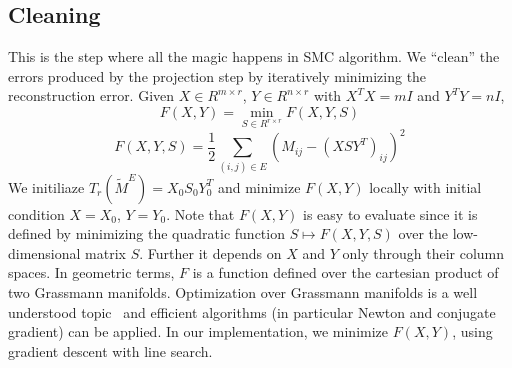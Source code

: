 \subsection{Cleaning}
This is the step where all the magic happens in SMC algorithm. We
``clean'' the errors produced by the projection step by iteratively
minimizing the reconstruction error. Given $X \in R^{m\times r}$,
$Y \in R^{n\times r}$ with $X^TX = mI$ and $Y^TY = nI$,
\begin{equation}
  F(X,Y) = \min_{S \in R^{r \times r}} F(X,Y,S)
\end{equation}
\begin{equation}
  F(X,Y,S) = \frac{1}{2} \sum\limits_{(i,j) \in E} (M_{ij} - (XSY^T)_{ij})^2
\end{equation}
We initiliaze $T_r(\widetilde{M}^E) = X_0S_0Y_0^T$ and minimize
$F(X, Y)$ locally with initial condition $X = X_0$, $Y = Y_0$. Note
that $F(X, Y)$ is easy to evaluate since it is defined by minimizing
the quadratic function $S \mapsto F(X, Y, S)$ over the low-dimensional
matrix $S$. Further it depends on $X$ and $Y$ only through their
column spaces. In geometric terms, $F$ is a function defined over the
cartesian product of two Grassmann manifolds. Optimization over
Grassmann manifolds is a well understood
topic~\cite{edelman1998geometry} and efficient algorithms (in
particular Newton and conjugate gradient) can be applied. In our
implementation, we minimize $F(X, Y)$, using gradient descent with
line search.
